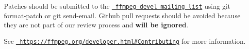 Patches should be submitted to the \href{https://ffmpeg.org/mailman/listinfo/ffmpeg-devel}{\texttt{ ffmpeg-\/devel mailing list}} using {\ttfamily git format-\/patch} or {\ttfamily git send-\/email}. Github pull requests should be avoided because they are not part of our review process and {\bfseries{will be ignored}}.

See \href{https://ffmpeg.org/developer.html\#Contributing}{\texttt{ https\+://ffmpeg.\+org/developer.\+html\#\+Contributing}} for more information. 